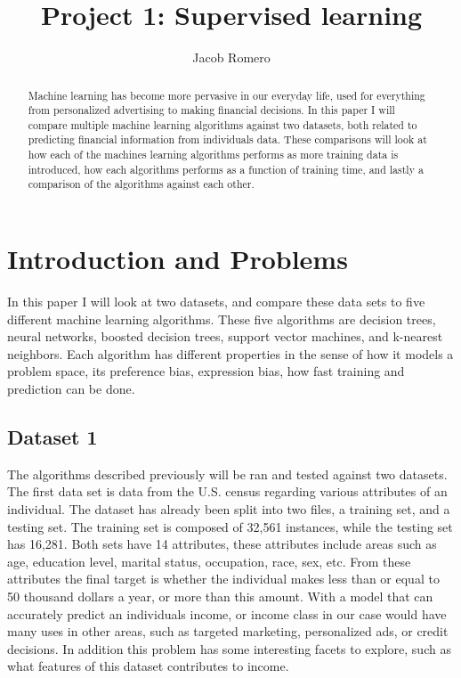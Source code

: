 \documentclass[
	letterpaper, %
]{IEEEtran}
\author{Jacob Romero}
\title{Project 1: Supervised learning}
\begin{document}
	\maketitle
	
	\begin{abstract}
		Machine learning has become more pervasive in our everyday life, used for everything from personalized advertising to making financial decisions. In this paper I will compare multiple machine learning algorithms against two datasets, both related to predicting financial information from individuals data. These comparisons will look at how each of the machines learning algorithms performs as more training data is introduced, how each algorithms performs as a function of training time, and lastly a comparison of the algorithms against each other.
	\end{abstract}
	
	\section{Introduction and Problems}
	In this paper I will look at two datasets, and compare these data sets to five different machine learning algorithms. These five algorithms are decision trees, neural networks, boosted decision trees, support vector machines, and k-nearest neighbors. Each algorithm has different properties in the sense of how it models a problem space, its preference bias, expression bias, how fast training and prediction can be done.
	
	\subsection{Dataset 1}
	The algorithms described previously will be ran and tested against two datasets. The first data set is data from the U.S. census regarding various attributes of an individual. The dataset has already been split into two files, a training set, and a testing set. The training set is composed of 32,561 instances, while the testing set has 16,281. Both sets have 14 attributes, these attributes include areas such as age, education level, marital status, occupation, race, sex, etc. From these attributes the final target is whether the individual makes less than or equal to 50 thousand dollars a year, or more than this amount. With a model that can accurately predict an individuals income, or income class in our case would have many uses in other areas, such as targeted marketing, personalized ads, or credit decisions. In addition this problem has some interesting facets to explore, such as what features of this dataset contributes to income.
	
\end{document}
